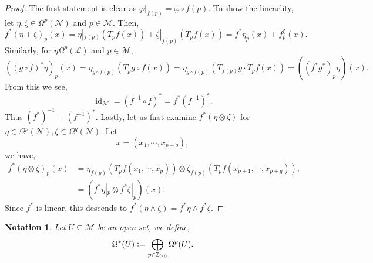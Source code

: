 \documentclass[10pt]{article}
\newtheorem{notation}{Notation}[section]
\DeclareMathOperator{\id}{id}
\newcommand{\defeq}{\vcentcolon=}
\newcommand{\Z}[0]{\mathbb{Z}}
\newcommand{\M}[0]{\mathcal{M}}
\newcommand{\maniN}[0]{\mathcal{N}}
\begin{document}
\begin{proof}
  The first statement is clear as $\varphi|_{f(p)} = \varphi\circ f(p)$. To show the linearlity, let $\eta,\zeta\in\Omega^p(\maniN)$ and $p\in\M$. Then,
  \begin{equation*}
    f^*(\eta+\zeta)_p(x) = \eta|_{f(p)}(T_pf(x))+\zeta|_{f(p)}(T_pf(x)) = f^*\eta_p(x)+f^\zeta_p(x).
  \end{equation*} 
  Similarly, for $\eta\Omega^p(\mathcal{L})$ and $p\in\M$, 
  \begin{equation*}
    ((g\circ f)^*\eta)_p(x) = \eta_{g\circ f(p)}(T_pg\circ f(x)) = \eta_{g\circ f(p)}(T_{f(p)}g\cdot T_p f(x)) = ((f^*g^*)_p\eta)(x).
  \end{equation*}
  From this we see,
  \begin{equation*}
    \id_\M = (f^{-1}\circ f)^* = f^*(f^{-1})^*.
  \end{equation*}
  Thus $(f^*)^{-1} = (f^{-1})^*$. Lastly, let us first examine $f^*(\eta\otimes \zeta)$ for $\eta\in\Omega^p(\maniN),\zeta\in\Omega^q(\maniN)$. Let 
  \begin{equation*}
    x = (x_1,\cdots,x_{p+q}),
  \end{equation*}
  we have,
  \begin{align*}
    f^*(\eta\otimes\zeta)_p(x) &= \eta_{f(p)}(T_pf(x_1,\cdots,x_p))\otimes \zeta_{f(p)}(T_pf(x_{p+1},\cdots,x_{p+q})),\\
    & = (f^*\eta|_p\otimes f^*\zeta|_p)(x).
  \end{align*}
  Since $f^*$ is linear, this descends to $f^*(\eta\wedge\zeta) = f^*\eta\wedge f^*\zeta$.
\end{proof}

\begin{notation}Let $U\subseteq\M$ be an open set, we define,
  \begin{equation*}
    \Omega^*(U) \defeq \bigoplus_{p\in\Z_{\geq0}}\Omega^p(U).
  \end{equation*}
\end{notation}
\end{document}
